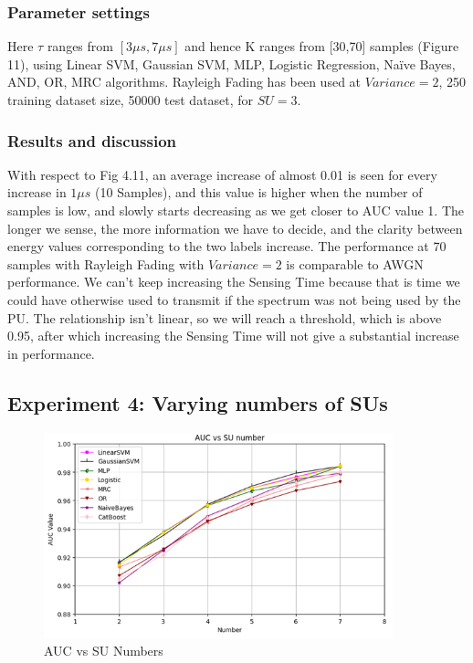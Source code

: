 \subsubsection{Parameter settings}

Here $\tau$ ranges from $[3\mu s,7\mu s]$ and hence K ranges from [30,70] samples (Figure 11), using Linear SVM, Gaussian SVM, MLP, Logistic Regression, Naïve Bayes, AND, OR, MRC algorithms. Rayleigh Fading has been used at $Variance=2$, 250 training dataset size, 50000 test dataset, for $SU=3$.


\subsubsection{Results and discussion}
With respect to Fig 4.11, an average increase of almost 0.01 is seen for every increase in $1 \mu s$ (10 Samples), and this value is higher when the number of samples is low, and slowly starts decreasing as we get closer to AUC value 1. The longer we sense, the more information we have to decide, and the clarity between energy values corresponding to the two labels increase. The performance at 70 samples with Rayleigh Fading with $Variance=2$ is comparable to AWGN performance. We can’t keep increasing the Sensing Time because that is time we could have otherwise used to transmit if the spectrum was not being used by the PU. The relationship isn’t linear, so we will reach a threshold, which is above 0.95, after which increasing the Sensing Time will not give a substantial increase in performance.

\subsection{Experiment 4: Varying numbers of SUs}

\begin{figure}
  \begin{center}
  \includegraphics[width=0.9\textwidth]{figs/12.png}
  \end{center}
  \caption{AUC vs SU Numbers}
\end{figure}



